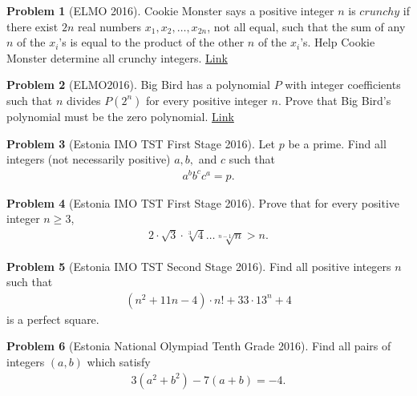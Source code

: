 \documentclass[]{article}
\theoremstyle{definition}
\newtheorem{problem}{Problem}
\begin{document}
\begin{problem}[ELMO 2016]
	Cookie Monster says a positive integer $n$ is $crunchy$ if there exist $2n$ real numbers $x_1,x_2,\ldots,x_{2n}$, not all equal, such that the sum of any $n$ of the $x_i$'s is equal to the product of the other $n$ of the $x_i$'s. Help Cookie Monster determine all crunchy integers. \hfill \href{http://artofproblemsolving.com/community/c6h1262189p6556895}{Link}
\end{problem}



\begin{problem}[ELMO‌2016]
	Big Bird has a polynomial $P$ with integer coefficients such that $n$ divides $P(2^n)$ for every positive integer $n$. Prove that Big Bird's polynomial must be the zero polynomial. \hfill \href{http://artofproblemsolving.com/community/c6h1262192p6556902}{Link}
\end{problem}




\begin{problem}[Estonia IMO TST First Stage 2016]
	Let $p$ be a prime. Find all integers (not necessarily positive) $a,b,$ and $c$ such that
		\begin{align*}
			a^bb^cc^a = p.
		\end{align*}
\end{problem}



\begin{problem}[Estonia IMO TST First Stage 2016]
	Prove that for every positive integer $n \geq 3$,
		\begin{align*}
			2 \cdot \sqrt 3 \cdot \sqrt[3]{4} \dots \sqrt[n-1]{n} >n.
		\end{align*}
\end{problem}


\begin{problem}[Estonia IMO TST Second Stage 2016]
	Find all positive integers $n$ such that
		\begin{align*}
			\left(n^2+11n-4\right)\cdot n! + 33 \cdot 13^n + 4
		\end{align*}
	is a perfect square.
\end{problem}


\begin{problem}[Estonia National Olympiad Tenth Grade 2016]
	Find all pairs of integers $(a, b)$ which satisfy
		\begin{align*}
			3 (a^2 + b^2 ) - 7 (a + b) = -4.
		\end{align*}
\end{problem}
\end{document}
